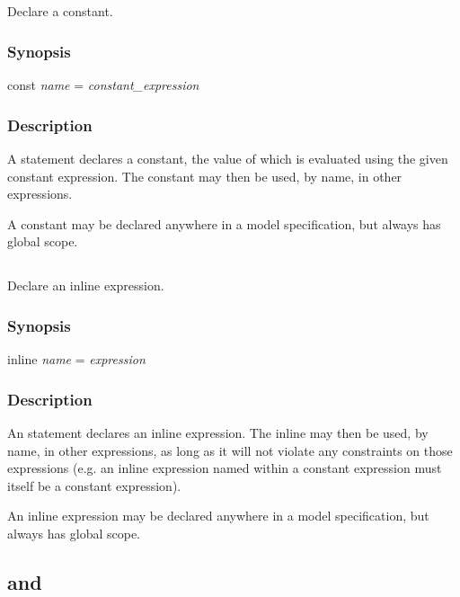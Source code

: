\subsection{\label{const}}

Declare a constant.

\subsubsection*{Synopsis\label{const_Synopsis}}
\begin{bicode}
    const \textsl{name} = \textsl{constant_expression}
\end{bicode}

\subsubsection*{Description\label{const_description}}

A  statement declares a constant, the value of which is evaluated
using the given constant expression. The constant
may then be used, by name, in other expressions.

A constant may be declared anywhere in a model specification, but always has
global scope.

\subsection{\label{inline}}

Declare an inline expression.

\subsubsection*{Synopsis\label{inline_synopsis}}
\begin{bicode}
    inline \textsl{name} = \textsl{expression}
\end{bicode}

\subsubsection*{Description\label{inline_description}}

An  statement declares an inline expression. The inline may then be used, by name, in other expressions, as
long as it will not violate any constraints on those expressions (e.g. an
inline expression named within a constant expression must itself be a constant
expression).

An inline expression may be declared anywhere in a model specification, but
always has global scope.

\subsection{\label{sub}}

\subsection{ and \label{do_then}}
